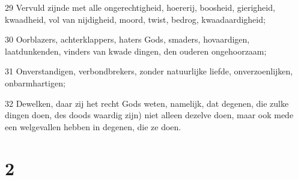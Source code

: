 \par 29 Vervuld zijnde met alle ongerechtigheid, hoererij, boosheid, gierigheid, kwaadheid, vol van nijdigheid, moord, twist, bedrog, kwaadaardigheid;
\par 30 Oorblazers, achterklappers, haters Gods, smaders, hovaardigen, laatdunkenden, vinders van kwade dingen, den ouderen ongehoorzaam;
\par 31 Onverstandigen, verbondbrekers, zonder natuurlijke liefde, onverzoenlijken, onbarmhartigen;
\par 32 Dewelken, daar zij het recht Gods weten, namelijk, dat degenen, die zulke dingen doen, des doods waardig zijn) niet alleen dezelve doen, maar ook mede een welgevallen hebben in degenen, die ze doen.

\chapter{2}

